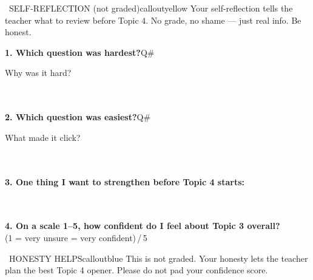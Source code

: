 \documentclass[11pt]{article}
\begin{document}

\begin{callout}{\IconTarget\ SELF-REFLECTION (not graded)}{calloutyellow}
Your self-reflection tells the teacher what to review before Topic 4. No grade, no shame --- just real info. Be honest.
\end{callout}

\vspace{0.4em}

\textbf{1. Which question was hardest?}\quad Q\#\makebox[0.8in]{\dotfill}

\smallskip
Why was it hard?\\[0.2em]
\dotfill\\[0.2em]
\dotfill\\

\vspace{0.4em}

\textbf{2. Which question was easiest?}\quad Q\#\makebox[0.8in]{\dotfill}

\smallskip
What made it click?\\[0.2em]
\dotfill\\[0.2em]
\dotfill\\

\vspace{0.4em}

\textbf{3. One thing I want to strengthen before Topic 4 starts:}\\[0.2em]
\dotfill\\[0.2em]
\dotfill\\

\vspace{0.4em}

\textbf{4. On a scale 1--5, how confident do I feel about Topic 3 overall?}\\[0.4em]
\hspace*{0.3in}(1 = very unsure  = very confident)\quad\makebox[0.6in]{\dotfill}\,/\,5

\vspace{0.8em}

\begin{callout}{\IconSpeak\ HONESTY HELPS}{calloutblue}
This is not graded. Your honesty lets the teacher plan the best Topic 4 opener. Please do not pad your confidence score.
\end{callout}
\end{document}

